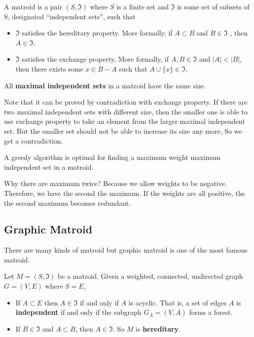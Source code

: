 \begin{definition}
A matroid is a pair $(S, \mathfrak{I})$ where $S$ is a finite set and $\mathfrak{I}$ is some set of subsets of S, designated ``independent sets'', such that
\begin{itemize}
	\item $\mathfrak{I}$ satisfies the hereditary property. More formally, if $A \subset B$ and $ B \in \mathfrak{I} $ , then $ A \in \mathfrak{I} $.
	\item $\mathfrak{I}$ satisfies the exchange property. More formally, if $A, B \in \mathfrak{I}$ and $|A| < |B|$, then there exists some $x \in B - A$ such that $A \cup \{x\}\in \mathfrak{I}$.
\end{itemize}
\end{definition}
All \textbf{maximal independent sets} in a matroid have the same size. 

Note that it can be proved by contradiction with exchange property. If there are two maximal independent sets with different size, then the smaller one is able to use exchange property to take an element from the larger maximal independent set. But the smaller set should not be able to increase its size any more, So we get a contradiction.

A greedy algorithm is optimal for finding a maximum weight maximum independent set in a matroid. 

Why there are maximum twice? Because we allow weights to be negative. Therefore, we have the second the maximum. If the weights are all positive, the the second maximum becomes redundant.
\subsection{Graphic Matroid}
There are many kinds of matroid but graphic matroid is one of the most famous matroid.
\begin{definition}
	Let $ M = (S, \mathfrak{I}) $ be a matroid. Given a weighted, connected, undirected graph $ G = (V , E) $ where $ S = E $,
	\begin{itemize}
		\item If $ A \subset E $ then $A \in \mathfrak{I}$ if and only if $ A $ is acyclic. That is, a set of edges $A$ is \textbf{independent} if and only if the subgraph $G_A = (V, A)$ forms a forest.
		\item If $ B \in \mathfrak{I} $ and $ A \subset B $, then $ A \in \mathfrak{I} $. So $ M $ is \textbf{hereditary}.
	\end{itemize}
\end{definition}

